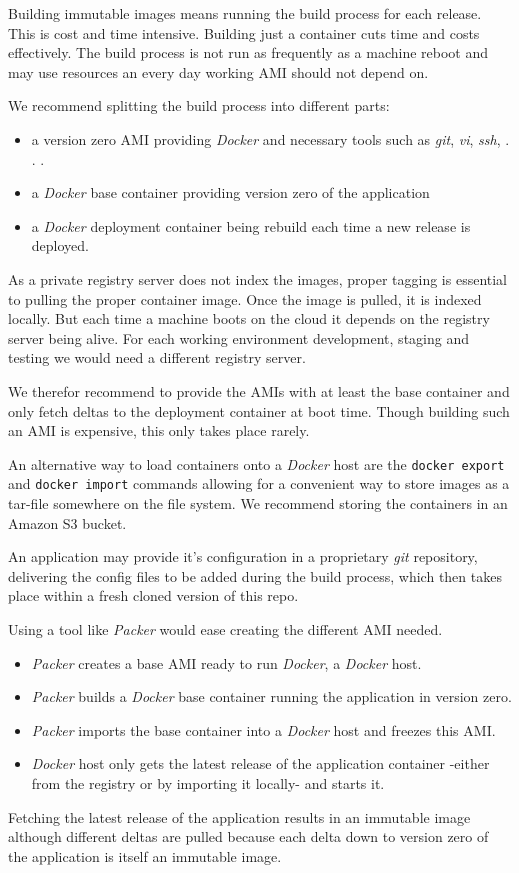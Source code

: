 \documentclass[captions=tableheading]{article}
\begin{document}
Building immutable images means running the build process for each release. This is cost and time intensive. Building just a container cuts time and costs effectively. The build process is not run as frequently as a machine reboot and may use resources an every day working AMI should not depend on. 

We recommend splitting the build process into different parts:
\begin{itemize}
\item a version zero AMI providing \emph{Docker} and necessary tools such as \emph{git}, \emph{vi}, \emph{ssh}, . . .
\item a \emph{Docker} base container providing version zero of  the application
\item a \emph{Docker} deployment container being rebuild each time a new release is deployed.
\end{itemize}

As a private registry server does not index the images, proper tagging is essential to pulling the proper container image. Once the image is pulled, it is indexed locally. But each time a machine boots on the cloud it depends on the registry server being alive. For each working environment development, staging and testing we would need a different registry server. 

We therefor recommend to provide the AMIs with at least the base container and only fetch deltas to the deployment container at boot time. Though building such an AMI is expensive, this only takes place rarely.

An alternative way to load containers onto a \emph{Docker} host are the \texttt{docker export} and \texttt{docker import} commands allowing for a convenient way to store images as a tar-file somewhere on the file system. We recommend storing the containers in an Amazon S3 bucket.

An application may provide it's configuration in a proprietary \emph{git} repository, delivering the config files to be added during the build process, which then takes place within a fresh cloned version of this repo. 


Using a tool like \emph{Packer} would ease creating the different AMI needed.
\begin{itemize}
\item \emph{Packer} creates a base AMI ready to run \emph{Docker}, a \emph{Docker} host.
\item \emph{Packer} builds a \emph{Docker} base container running the application in version zero.
\item \emph{Packer} imports the base container into a \emph{Docker} host and freezes this AMI.
\item \emph{Docker} host only gets the latest release of the application container -either from the registry or by importing it locally- and starts it.
\end{itemize}
Fetching the latest release of the application results in an immutable image although different deltas are pulled because each delta down to version zero of the application is itself an  immutable image.
\end{document}
